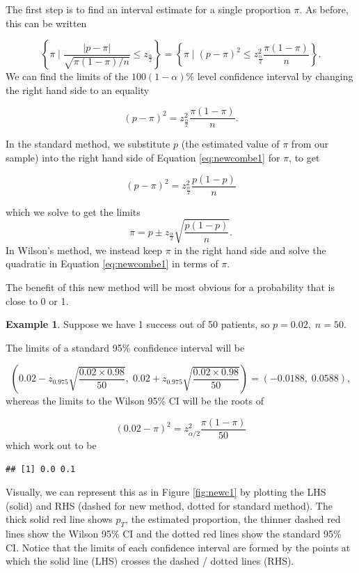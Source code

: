 \documentclass[
  openany]{book}
\theoremstyle{definition}
\theoremstyle{definition}
\newtheorem{example}{Example}[chapter]
\theoremstyle{definition}
\theoremstyle{definition}
\theoremstyle{remark}
\begin{document}
The first step is to find an interval estimate for a single proportion \(\pi\). As before, this can be written

\[\left\lbrace \pi \mid \frac{\lvert p - \pi \rvert}{\sqrt{\pi\left(1-\pi\right)/n}} \leq z_{\frac{\alpha}{2}} \right\rbrace = \left\lbrace \pi \mid \left(p - \pi\right)^2 \leq z^2_{\frac{\alpha}{2}}\frac{\pi\left(1-\pi\right)}{n} \right\rbrace. \]
We can find the limits of the \(100\left(1-\alpha\right)\)\% level confidence interval by changing the right hand side to an equality

\begin{equation}
\left(p - \pi\right)^2 = z^2_{\frac{\alpha}{2}}\frac{\pi\left(1-\pi\right)}{n}.
\label{eq:newcombe1}
\end{equation}

In the standard method, we substitute \(p\) (the estimated value of \(\pi\) from our sample) into the right hand side of Equation \eqref{eq:newcombe1} for \(\pi\), to get

\[\left(p - \pi\right)^2 = z^2_{\frac{\alpha}{2}}\frac{p\left(1-p\right)}{n}\]

which we solve to get the limits
\[ \pi = p \pm z_{\frac{\alpha}{2}}\sqrt{\frac{p\left(1-p\right)}{n}}.\]
In Wilson's method, we instead keep \(\pi\) in the right hand side and solve the quadratic in Equation \eqref{eq:newcombe1} in terms of \(\pi\).

The benefit of this new method will be most obvious for a probability that is close to 0 or 1.

\begin{example}
Suppose we have 1 success out of 50 patients, so \(p=0.02,\;n=50\).

The limits of a standard 95\% confidence interval will be

\[\left(0.02 - z_{0.975}\sqrt{\frac{0.02\times{0.98}}{50}},\; 0.02 + z_{0.975}\sqrt{\frac{0.02\times{0.98}}{50}}\right) = \left(-0.0188,\;0.0588\right),\]
whereas the limits to the Wilson 95\% CI will be the roots of

\[\left(0.02-\pi\right)^2 = z^2_{\alpha/2}\frac{\pi\left(1-\pi\right)}{50}\]
which work out to be

\begin{verbatim}
## [1] 0.0 0.1
\end{verbatim}

Visually, we can represent this as in Figure \ref{fig:newc1} by plotting the LHS (solid) and RHS (dashed for new method, dotted for standard method). The thick solid red line shows \(p_T\), the estimated proportion, the thinner dashed red lines show the Wilson 95\% CI and the dotted red lines show the standard 95\% CI. Notice that the limits of each confidence interval are formed by the points at which the solid line (LHS) crosses the dashed / dotted lines (RHS).
\end{example}
\end{document}
